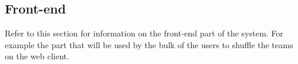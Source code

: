 \subsection{Front-end}
	Refer to this section for information on the front-end part of the system. For example the part that will be used by the bulk of the users to shuffle the teams on the web client.\par
	\vspace{0.3cm}
	
